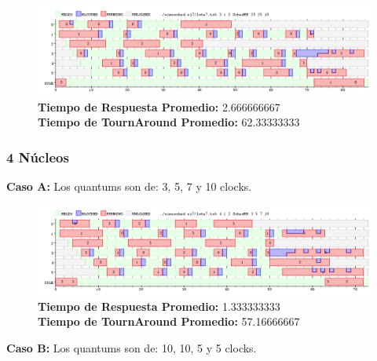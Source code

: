 \documentclass[a4paper]{article}
\begin{document}
		 \begin{figure}[h!]
   \begin{center}
 	\includegraphics[scale=0.5]{imagenes/ej7/3nucleoC.png}
 	\textbf{Tiempo de Respuesta Promedio:} 2.666666667 \\
 	\textbf{Tiempo de TournAround Promedio:} 62.33333333 \\
   \end{center}
 \end{figure} 
 
 \newpage
	\subsubsection*{4 N\'ucleos}
	
	\textbf{Caso A:}  Los quantums son de: 3, 5, 7 y 10 clocks.
	
		 \begin{figure}[h!]
   \begin{center}
 	\includegraphics[scale=0.5]{imagenes/ej7/4nucleoA.png}
 	\textbf{Tiempo de Respuesta Promedio:} 1.333333333 \\
 	\textbf{Tiempo de TournAround Promedio:} 57.16666667 \\
   \end{center}
 \end{figure} 
 	
	\textbf{Caso B:}  Los quantums son de: 10, 10, 5 y 5 clocks.
	
\end{document}
